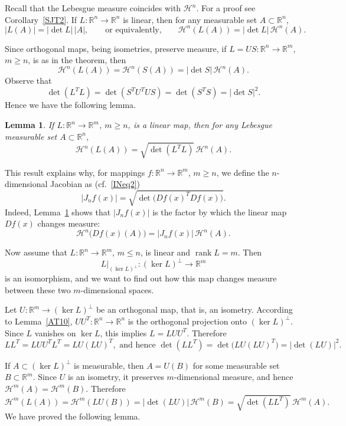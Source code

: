 \documentclass[12pt,leqno]{amsart}
\newtheorem{lemma}[theorem]{Lemma}
\theoremstyle{definition}
\def\H{{\mathcal H}}
\numberwithin{theorem}{section} \numberwithin{equation}{section}
\begin{document}
Recall that the Lebesgue measure coincides with $\H^n$. For a proof see Corollary~\ref{SJT2}.
If $L:\mathbb{R}^{n}\to \mathbb{R}^{n}$ is linear, then for any
measurable set $A\subset \mathbb{R}^{n}$,
\[
 |L(A)|=|\det L|\, |A|,
\qquad
\text{or equivalently,}
\qquad
\mathcal{H}^{n}(L(A))=|\det L|\,\mathcal{H}^{n}(A).
\]

Since orthogonal maps, being isometries, preserve measure, if
$L=US:\mathbb{R}^{n}\to \mathbb{R}^{m}$, $m\geq n$, is as in the
theorem, then
\[
\mathcal{H}^{n}(L(A))
=
\mathcal{H}^{n}(S(A))
=
|\det S|\,\mathcal{H}^{n}(A).
\]
Observe that
\[
\det(L^{T}L)
=
\det(S^{T}U^{T}US)
=
\det(S^{T}S)
=
|\det S|^{2}.
\]
Hence we have the following lemma.

\begin{lemma}
\label{AT8}
If $L:\mathbb{R}^{n}\to \mathbb{R}^{m}$, $m\geq n$, is a linear map,
then for any Lebesgue
measurable set $A\subset \mathbb{R}^{n}$,
\[
\mathcal{H}^{n}(L(A))
=
\sqrt{\det(L^{T}L)}\,\mathcal{H}^{n}(A).
\]
\end{lemma}
This result explains why, for mappings
$f:\mathbb{R}^{n}\to \mathbb{R}^{m}$, $m\geq n$, we define the
$n$-dimensional Jacobian as (cf.\ \eqref{INeq2})
\[
|J_{n}f(x)|
=
\sqrt{\det\big(Df(x)^{T}Df(x)\big)}.
\]
Indeed, Lemma~\ref{AT8} shows that
$|J_{n}f(x)|$ is the factor by which the linear map $Df(x)$ changes measure:
\[
\mathcal{H}^{n}\bigl(Df(x)(A)\bigr)
=
|J_{n}f(x)|\,\mathcal{H}^{n}(A).
\]


Now assume that $L:\mathbb{R}^{n}\to\mathbb{R}^{m}$, $m\leq n$, is
linear and $\operatorname{rank} L=m$. Then
$$
L|_{(\ker L)^{\perp}}:(\ker L)^{\perp}\to\mathbb{R}^{m}
$$
is an isomorphism, and we want to find out how this map changes measure between
these two $m$-dimensional spaces.

Let $U:\mathbb{R}^{m}\to(\ker L)^{\perp}$ be an orthogonal map, that is,
an isometry. According to Lemma~\ref{AT10},
$UU^{T}:\mathbb{R}^{n}\to\mathbb{R}^{n}$ is the orthogonal projection onto
$(\ker L)^{\perp}$. Since $L$ vanishes on $\ker L$, this implies
$L=LUU^{T}$. Therefore
$$
LL^{T}=LUU^{T}L^{T}=LU(LU)^{T},
\text{ and hence }
\det(LL^{T})=\det\bigl(LU(LU)^{T}\bigr)=|\det(LU)|^{2}.
$$

If $A\subset(\ker L)^{\perp}$ is measurable, then $A=U(B)$ for some
measurable set $B\subset\mathbb{R}^{m}$. Since $U$ is an isometry, it
preserves $m$-dimensional measure, and hence
$\mathcal{H}^{m}(A)=\mathcal{H}^{m}(B)$. Therefore
$$
\mathcal{H}^{m}(L(A))
=
\mathcal{H}^{m}(LU(B))
=
|\det(LU)|\,\mathcal{H}^{m}(B)
=
\sqrt{\det(LL^{T})}\,\mathcal{H}^{m}(A).
$$
We have proved the following lemma.
\end{document}
